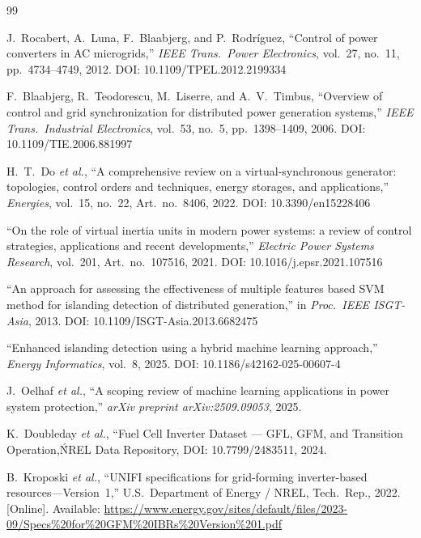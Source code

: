 \documentclass[journal]{IEEEtran}
\begin{document}
\begin{thebibliography}{99}

J.~Rocabert, A.~Luna, F.~Blaabjerg, and P.~Rodr{\'i}guez,
``Control of power converters in AC microgrids,''
\textit{IEEE Trans.\ Power Electronics},
vol.~27, no.~11, pp.~4734--4749, 2012.
DOI: 10.1109/TPEL.2012.2199334

F.~Blaabjerg, R.~Teodorescu, M.~Liserre, and A.~V.~Timbus,
``Overview of control and grid synchronization for distributed
power generation systems,''
\textit{IEEE Trans.\ Industrial Electronics},
vol.~53, no.~5, pp.~1398--1409, 2006.
DOI: 10.1109/TIE.2006.881997

H.~T.~Do \textit{et al.},
``A comprehensive review on a virtual-synchronous generator: topologies,
control orders and techniques, energy storages, and applications,''
\textit{Energies}, vol.~15, no.~22, Art.~no.~8406, 2022.
DOI: 10.3390/en15228406

``On the role of virtual inertia units in modern power systems:
a review of control strategies, applications and recent developments,''
\textit{Electric Power Systems Research}, vol.~201, Art.~no.~107516, 2021.
DOI: 10.1016/j.epsr.2021.107516

``An approach for assessing the effectiveness of multiple features based
SVM method for islanding detection of distributed generation,''
in \textit{Proc.\ IEEE ISGT-Asia}, 2013.
DOI: 10.1109/ISGT-Asia.2013.6682475

``Enhanced islanding detection using a hybrid machine learning approach,''
\textit{Energy Informatics}, vol.~8, 2025.
DOI: 10.1186/s42162-025-00607-4

J.~Oelhaf \textit{et al.},
``A scoping review of machine learning applications in power system protection,''
\textit{arXiv preprint arXiv:2509.09053}, 2025.

K.~Doubleday \textit{et al.}, ``Fuel Cell Inverter Dataset --- GFL, GFM,
and Transition Operation,\'\' NREL Data Repository, DOI: 10.7799/2483511, 2024.

B.~Kroposki \textit{et al.},
``UNIFI specifications for grid-forming inverter-based resources---Version~1,''
U.S.\ Department of Energy / NREL, Tech.\ Rep., 2022.
[Online]. Available: \url{https://www.energy.gov/sites/default/files/2023-09/Specs\%20for\%20GFM\%20IBRs\%20Version\%201.pdf}


\end{thebibliography}
\end{document}
